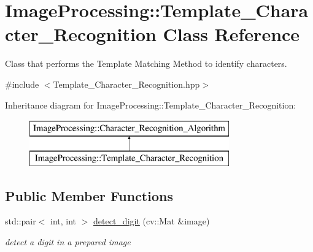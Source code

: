\hypertarget{class_image_processing_1_1_template___character___recognition}{}\section{Image\+Processing\+:\+:Template\+\_\+\+Character\+\_\+\+Recognition Class Reference}
\label{class_image_processing_1_1_template___character___recognition}


Class that performs the Template Matching Method to identify characters.  




{\ttfamily \#include $<$Template\+\_\+\+Character\+\_\+\+Recognition.\+hpp$>$}

Inheritance diagram for Image\+Processing\+:\+:Template\+\_\+\+Character\+\_\+\+Recognition\+:\begin{figure}[H]
\begin{center}
\leavevmode
\includegraphics[height=2.000000cm]{class_image_processing_1_1_template___character___recognition}
\end{center}
\end{figure}
\subsection*{Public Member Functions}
\begin{DoxyCompactItemize}
\item 
\mbox{\label{class_image_processing_1_1_template___character___recognition_a70b7337f493c829d8e5879b75bc98342}} 
std\+::pair$<$ int, int $>$ \mbox{\hyperlink{class_image_processing_1_1_template___character___recognition_a70b7337f493c829d8e5879b75bc98342}{detect\+\_\+digit}} (cv\+::\+Mat \&image)
\begin{DoxyCompactList}\small\item\em detect a digit in a prepared image \end{DoxyCompactList}\end{DoxyCompactItemize}
